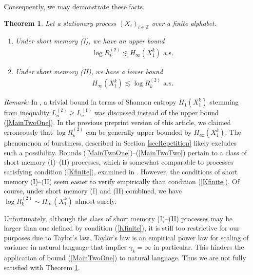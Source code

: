 \documentclass[a4paper,12pt]{article}
\newtheorem{theorem}{Theorem}
\begin{document}
Consequently, we may demonstrate these facts.
\begin{theorem}
  \label{theoMainTwo}
  Let a stationary process $(X_i)_{i\in\mathbb{Z}}$ over a finite
  alphabet.
  \begin{enumerate}
  \item Under short memory (I), we have an upper bound
  \begin{align}
    \label{MainTwoOne}
    \log R^{(2)}_k\lesssim
    H_\infty(X_1^k)
    \text{ a.s.}
  \end{align}
  \item Under short memory (II), we have a lower bound
  \begin{align}
    \label{MainTwoTwo}
    H_\infty(X_1^k)\lesssim \log R^{(2)}_k
    \text{ a.s.}
  \end{align}
  \end{enumerate}
\end{theorem}
\emph{Remark:} In \citep{Debowski18b,Debowski21}, a trivial bound in
terms of Shannon entropy $H_1(X_1^k)$ stemming from inequality
$L^{(2)}_n\ge L^{(1)}_n$ was discussed instead of the upper bound
(\ref{MainTwoOne}). In the previous preprint version of this article,
we claimed erroneously that $\log R^{(2)}_k$ can be generally upper
bounded by $H_\infty(X_1^k)$. The phenomenon of burstiness, described
in Section \ref{secRepetition} likely excludes such a possibility.
Bounds (\ref{MainTwoOne})--(\ref{MainTwoTwo}) pertain to a class of
short memory (I)--(II) processes, which is somewhat comparable to
processes satisfying condition (\ref{Kfinite}), examined in
\citep{Szpankowski93,Szpankowski93a}. However, the conditions of short
memory (I)--(II) seem easier to verify empirically than condition
(\ref{Kfinite}). Of course, under short memory (I) and (II) combined,
we have $\log R^{(2)}_k\sim H_\infty(X_1^k)$ almost surely.

Unfortunately, although the class of short memory (I)--(II) processes
may be larger than one defined by condition (\ref{Kfinite}), it is
still too restrictive for our purposes due to Taylor's law. Taylor's
law is an empirical power law for scaling of variance in natural
language
\citep{GerlachAltmann14,KobayashiTanakaIshii2018,TanakaIshii21} that
implies $\gamma_k=\infty$ in particular. This hinders the application
of bound (\ref{MainTwoOne}) to natural language. Thus we are not fully
satisfied with Theorem \ref{theoMainTwo}.
\end{document}

